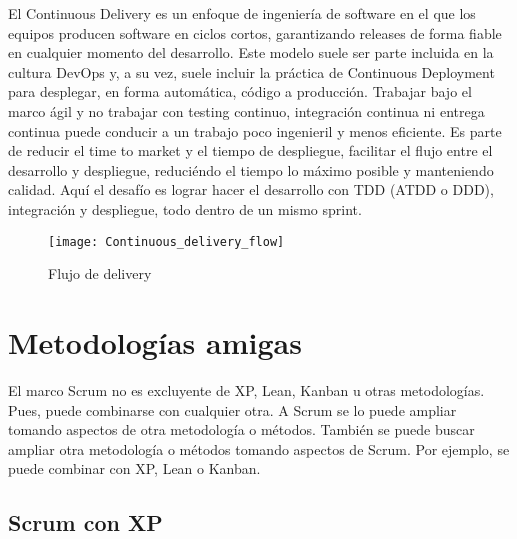 El Continuous Delivery es un enfoque de ingeniería de software en el que los equipos producen software en ciclos cortos, garantizando releases de forma fiable en cualquier momento del desarrollo. Este modelo suele ser parte incluida en la cultura DevOps y, a su vez, suele incluir la práctica de Continuous Deployment para desplegar, en forma automática, código a producción. Trabajar bajo el marco ágil y no trabajar con testing continuo, integración continua ni entrega continua puede conducir a un trabajo poco ingenieril y menos eficiente. Es parte de reducir el time to market y el tiempo de despliegue, facilitar el flujo entre el desarrollo y despliegue, reduciéndo el tiempo lo máximo posible y manteniendo calidad. Aquí el desafío es lograr hacer el desarrollo con TDD (ATDD o DDD), integración y despliegue, todo dentro de un mismo sprint.

\begin{figure}[h]
  \centering
  \texttt{[image: Continuous\_delivery\_flow]}
  \caption{Flujo de delivery}
  \centering
  \label{fig:Continuous_delivery_flow} %
\end{figure}
\FloatBarrier %

\newpage
\section{Metodologías amigas}

El marco Scrum no es excluyente de XP, Lean, Kanban u otras metodologías. Pues, puede combinarse con cualquier otra. A Scrum se lo puede ampliar tomando aspectos de otra metodología o métodos. También se puede buscar ampliar otra metodología o métodos tomando aspectos de Scrum. Por ejemplo, se puede combinar con XP, Lean o Kanban.

\subsection{Scrum con XP}


